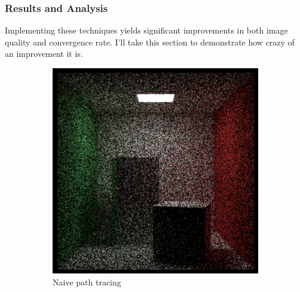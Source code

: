 \documentclass[12pt]{article}
\begin{document}
\subsubsection{Results and Analysis}

Implementing these techniques yields significant improvements in both image quality and convergence rate. I'll take this section to demonstrate how crazy of an improvement it is.

\begin{figure}[H]
    \centering
    \begin{subfigure}[t]{0.32\textwidth}
        \centering
        \includegraphics[width=\textwidth]{images/25_samp/randomPDF.png}
        \caption{Naive path tracing}
        \label{fig:naive_sampling}
    \end{subfigure}
    \hfill
    \begin{subfigure}[t]{0.32\textwidth}
        \centering

\end{subfigure}
\end{figure}
\end{document}
